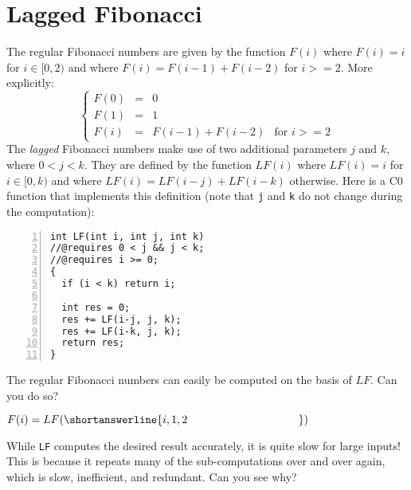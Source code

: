 \section*{Lagged Fibonacci}

The regular Fibonacci numbers are given by the function $F(i)$ where
$F(i) = i$ for $i \in [0, 2)$ and where $F(i) = F(i-1) + F(i-2)$ for
$i >= 2$.  More explicitly:
$$
\left\{
\begin{array}{llll}
   F(0) & = & 0
\\ F(1) & = & 1
\\ F(i) & = & F(i-1) + F(i-2) & \text{for } i >= 2
\end{array}
\right.
$$
The \emph{lagged} Fibonacci numbers make use of two additional
parameters $j$ and $k$, where $0 < j < k$.  They are defined by the
function $\mathit{LF}(i)$ where $\mathit{LF}(i) = i$ for $i \in [0,
k)$ and where $\mathit{LF}(i) =\mathit{LF}(i-j) + \mathit{LF}(i-k)$
otherwise.  Here is a C0 function that implements this definition
(note that \lstinline'j' and \lstinline'k' do not change during the
computation):

\begin{lstlisting}[numbers=left, belowskip=0pt]
int LF(int i, int j, int k)
//@requires 0 < j && j < k;
//@requires i >= 0;
{
  if (i < k) return i;

  int res = 0;
  res += LF(i-j, j, k);
  res += LF(i-k, j, k);
  return res;
}
\end{lstlisting}

\begin{part}
The regular Fibonacci numbers can easily be computed on the basis of
$\mathit{LF}$.  Can you do so?

$F(i) = LF(\shortanswerline{i, 1, 2\hspace*{10em}})$
\end{part}

While \lstinline'LF' computes the desired result accurately, it is
quite slow for large inputs! This is because it repeats many of the
sub-computations over and over again, which is slow, inefficient, and
redundant.  Can you see why?
